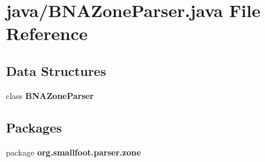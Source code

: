 \section{java/\-B\-N\-A\-Zone\-Parser.java File Reference}
\label{BNAZoneParser_8java}
\subsection*{Data Structures}
\begin{DoxyCompactItemize}
\item 
class {\bf B\-N\-A\-Zone\-Parser}
\end{DoxyCompactItemize}
\subsection*{Packages}
\begin{DoxyCompactItemize}
\item 
package {\bf org.\-smallfoot.\-parser.\-zone}
\end{DoxyCompactItemize}
